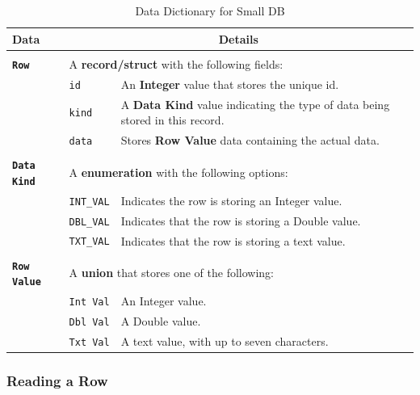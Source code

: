 \begin{table}[htbp]
  \centering
  \begin{tabular}{|l|l|l|}
    \hline
    \textbf{Data} & \multicolumn{2}{c|}{\textbf{Details}}  \\ 
    \hline
    \multicolumn{3}{c}{} \\
    \hline
    \textbf{\texttt{Row}} & \multicolumn{2}{l|}{A \textbf{record/struct} with the following fields:}  \\
    \hline
    & \texttt{id} & An \textbf{Integer} value that stores the unique id. \\
    \hline
    & \texttt{kind} & A \textbf{Data Kind} value indicating the type of data being stored in this record. \\
    \hline
    & \texttt{data} & Stores \textbf{Row Value} data containing the actual data. \\ 
    \hline
    \multicolumn{3}{c}{} \\
    \hline
    \textbf{\texttt{Data Kind}} & \multicolumn{2}{l|}{A \textbf{enumeration} with the following options:}\\
    \hline
    & \texttt{INT\_VAL} & Indicates the row is storing an Integer value. \\
    \hline
    & \texttt{DBL\_VAL} & Indicates that the row is storing a Double value. \\
    \hline
    &  \texttt{TXT\_VAL} & Indicates that the row is storing a text value. \\
    \hline
    \multicolumn{3}{c}{} \\
    \hline
    \textbf{\texttt{Row Value}} & \multicolumn{2}{l|}{A \textbf{union} that stores one of the following:}\\
    \hline
    & \texttt{Int Val} & An Integer value. \\
    \hline 
    & \texttt{Dbl Val} & A Double value. \\
    \hline
    & \texttt{Txt Val} & A text value, with up to seven characters. \\
    \hline
  \end{tabular}
  \caption{Data Dictionary for Small DB}
  \label{tbl:dd-small-db}
\end{table}


\subsubsection{Reading a Row} %
\label{ssub:reading_a_row}

